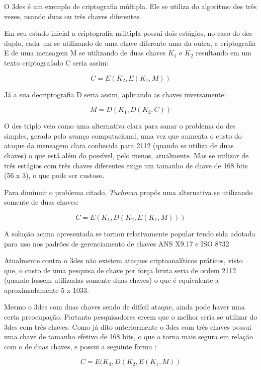 O \acrfull{3des} é um exemplo de criptografia múltipla. Ele se utiliza do algoritmo \acrshort{des} três vezes, usando duas ou três chaves diferentes.

Em seu estado inicial a criptografia múltipla possui dois estágios, no caso do \acrshort{des} duplo, cada um se utilizando de uma chave diferente uma da outra, a criptografia E de uma mensagem M se utilizando de duas chaves \(K_1\) e \(K_2\) resultando em um texto criptografado C seria assim:

\[C = E(K_2, E(K_1, M))\]

Já a sua decriptografia D seria assim, aplicando as chaves inversamente:

\[M = D(K_1, D(K_2, C))\]

O \acrshort{des} triplo veio como uma alternativa clara para sanar o problema do \acrshort{des} simples, gerado pelo avanço computacional, uma vez que aumenta o custo do ataque da mensagem clara conhecida para 2112 (quando se utiliza de duas chaves) o que está além do possível, pelo menos, atualmente. Mas se utilizar de três estágios com três chaves diferentes exige um tamanho de chave de 168 bits (56 x 3), o que pode ser custoso.

Para diminuir o problema citado, \textit{Tuchman} propôs uma alternativa se utilizando somente de duas chaves:

\[C = E(K_1, D(K_2, E(K_1, M)))\]

A solução acima apresentada se tornou relativamente popular tendo sida adotada para uso nos padrões de gerenciamento de chaves ANS X9.17 e ISO 8732.

Atualmente contra o \acrshort{3des} não existem ataques criptoanalíticos práticos, visto que, o custo de uma pesquisa de chave por força bruta seria de ordem 2112 (quando fossem utilizadas somente duas chaves) o que é equivalente a aproximadamente 5 x 1033. 

Mesmo o \acrshort{3des} com duas chaves sendo de difícil ataque, ainda pode haver uma certa preocupação. Portanto pesquisadores creem que o melhor seria se utilizar do \acrshort{3des} com três chaves. Como já dito anteriormente o \acrshort{3des} com três chaves possui uma chave de tamanho efetivo de 168 bits, o que a torna mais segura em relação com o de duas chaves, e possui a seguinte forma \cite{stallings14}:

\[C = E(K_3, D(K_2, E(K_1, M))\]

